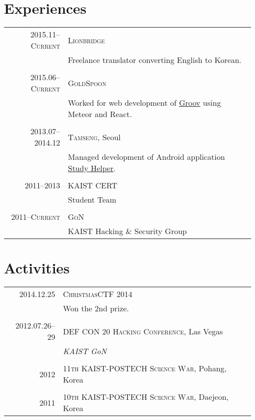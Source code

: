 \documentclass[a4paper,10pt]{article}
\begin{document}
\section{Experiences}
\begin{tabular}{r|p{11cm}}
  \textsc{2015.11--Current} & \textsc{Lionbridge} \\
  & Freelance translator converting English to Korean. \\
  \multicolumn{2}{c}{} \\

  \textsc{2015.06--Current} & \textsc{GoldSpoon} \\
  & Worked for web development of \href{http://groov.fm}{Groov} using Meteor and React. \\
  \multicolumn{2}{c}{} \\

  \textsc{2013.07--2014.12} & \textsc{Tamseng}, Seoul \\
  & Managed development of Android application \href{https://play.google.com/store/apps/details?id=kr.co.tamseng.StudyHelper}{Study Helper}. \\
  \multicolumn{2}{c}{} \\

  \textsc{2011--2013} & \textsc{KAIST CERT} \\
  & Student Team \\
  \multicolumn{2}{c}{} \\

  \textsc{2011--Current} & \textsc{GoN} \\
  & KAIST Hacking \& Security Group \\
\end{tabular}

\section{Activities}
\begin{tabular}{r|p{11cm}}
  \textsc{2014.12.25} & \textsc{ChristmasCTF 2014} \\
  & Won the 2nd prize. \\
  \multicolumn{2}{c}{} \\

  \textsc{2012.07.26--29} & \textsc{DEF CON 20 Hacking Conference}, Las Vegas \\
  & \emph{KAIST GoN} \\
  \multicolumn{2}{c}{} \\

  \textsc{2012} & \textsc{11th KAIST-POSTECH Science War}, Pohang, Korea \\
  \multicolumn{2}{c}{} \\

  \textsc{2011} & \textsc{10th KAIST-POSTECH Science War}, Daejeon, Korea \\
\end{tabular}
\end{document}
